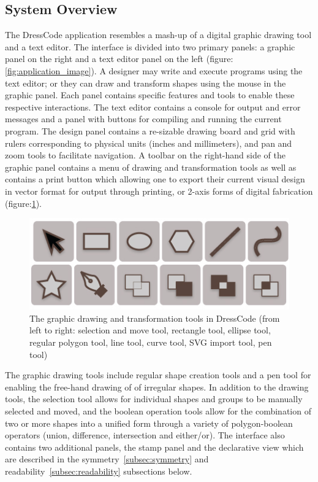 \documentclass{sigchi}
\begin{document}
\subsection{System Overview}
The DressCode application resembles a mash-up of a digital graphic drawing tool and a text editor. The interface is divided into two primary panels: a graphic panel on the right and a text editor panel on the left (figure:\ref{fig:application_image}). A designer may write and execute programs using the text editor; or they can draw and transform shapes using the mouse in the graphic panel. Each panel contains specific features and tools to enable these respective interactions. The text editor contains a console for output and error messages and a panel with buttons for compiling and running the current program. The design panel contains a re-sizable drawing board and grid with rulers corresponding to physical units (inches and millimeters), and pan and zoom tools to facilitate navigation. A toolbar on the right-hand side of the graphic panel contains a menu of drawing and transformation tools as well as contains a print button which allowing one to export their current visual design in vector format for output through printing, or 2-axis forms of digital fabrication (figure:\ref{fig:graphic_tools}).

\begin{center}
\begin{figure}[h!]
\includegraphics[width=\columnwidth]{images/graphic_tools.jpg}
\caption{The graphic drawing and transformation tools in DressCode (from left to right: selection and move tool, rectangle tool, ellipse tool, regular polygon tool, line tool, curve tool, SVG import tool, pen tool)}
\label{fig:graphic_tools}
\end{figure}
\end{center}
\vspace{-20pt}

The graphic drawing tools include regular shape creation tools and a pen tool for enabling the free-hand drawing of of irregular shapes. In addition to the drawing tools, the selection tool allows for individual shapes and groups to be manually selected and moved, and the boolean operation tools allow for the combination of two or more shapes into a unified form through a variety of polygon-boolean operators (union, difference, intersection and either/or). The interface also contains two additional panels, the stamp panel and the declarative view which are described in the symmetry~\ref{subsec:symmetry} and readability~\ref{subsec:readability} subsections below.
\end{document}
